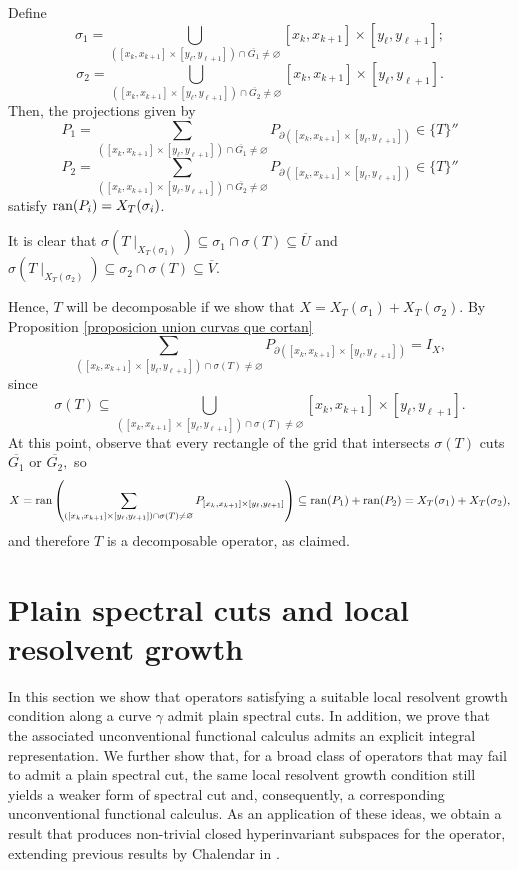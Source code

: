 \documentclass[11pt]{amsart}
\theoremstyle{definition}
\theoremstyle{remark}
\numberwithin{equation}{section}
\newcommand{\ran}{\textnormal{ran}}
\newcommand{\biconm}[1]{{\{#1\}''}}
\begin{document}
\smallskip


Define
    $$
    \sigma_1 = \bigcup_{([x_k,x_{k+1}]\times [y_\ell,y_{\ell+1}])\cap\overline{G_1} \neq \varnothing } [x_k,x_{k+1}]\times [y_\ell,y_{\ell+1}];
    $$
     $$
    \sigma_2 = \bigcup_{([x_k,x_{k+1}]\times[y_\ell,y_{\ell+1}])\cap\overline{G_2} \neq \varnothing } [x_k,x_{k+1}]\times [y_\ell,y_{\ell+1}].
    $$
Then, the projections given by
$$P_1 = \sum_{([x_k,x_{k+1}]\times [y_\ell,y_{\ell+1}])\cap\overline{G_1} \neq \varnothing } P_{\partial([x_k,x_{k+1}]\times [y_\ell,y_{\ell+1}])} \in \biconm{T}$$
$$P_2 = \sum_{([x_k,x_{k+1}]\times [y_\ell,y_{\ell+1}])\cap\overline{G_2} \neq \varnothing } P_{\partial([x_k,x_{k+1}]\times [y_\ell,y_{\ell+1}])} \in \biconm{T}$$
satisfy  $\ran(P_i)  = X_T(\sigma_i)$.

It is clear that $\sigma(T\mid_{ X_T(\sigma_1)}) \subseteq \sigma_1\cap \sigma(T)\subseteq \overline{U}$ and $\sigma(T\mid_{ X_T(\sigma_2)}) \subseteq \sigma_2\cap \sigma(T)\subseteq \overline{V}$.

Hence,  $T$ will be decomposable if we show that $X= X_T(\sigma_1)+X_T(\sigma_2).$ By Proposition \ref{proposicion union curvas que cortan}
    $$\sum_{([x_k,x_{k+1}]\times[y_\ell,y_{\ell+1}])\cap\sigma(T)\neq \varnothing } P_{\partial([x_k,x_{k+1}]\times [y_\ell,y_{\ell+1}])} = I_X,$$ since $$
    \sigma(T) \subseteq \bigcup_{([x_k,x_{k+1}]\times {[y_\ell,y_{\ell+1}]})\cap\sigma(T)\neq \varnothing } [x_k,x_{k+1}]\times {[y_\ell,y_{\ell+1}]}.
    $$
   At this point, observe that every rectangle of the grid that intersects $\sigma(T)$ cuts $\overline{G_1}$ or $\overline{G_2},$ so
   $$
   X= \ran\left(\sum_{([x_k,x_{k+1}]\times {[y_\ell,y_{\ell+1}]})\cap\sigma(T)\neq \varnothing } P_{[x_k,x_{k+1}]\times [y_\ell,y_{\ell+1}]} \right) \subseteq \ran(P_1)+\ran(P_2)=X_T(\sigma_1)+X_T(\sigma_2),
   $$
   and therefore $T$ is a decomposable operator, as claimed.


\section{Plain spectral cuts and local resolvent growth}\label{sec 4}

In this section we show that operators satisfying a suitable local resolvent growth condition along a curve $\gamma$ admit plain spectral cuts. In addition, we prove that the associated unconventional functional calculus admits an explicit integral representation. We further show that, for a broad class of operators that may fail to admit a plain spectral cut, the same local resolvent growth condition still yields a weaker form of spectral cut and, consequently, a corresponding unconventional functional calculus.
As an application of these ideas, we obtain a result that produces non-trivial closed hyperinvariant subspaces for the operator, extending previous results by Chalendar in \cite{Chalendar1997}.
\end{document}
